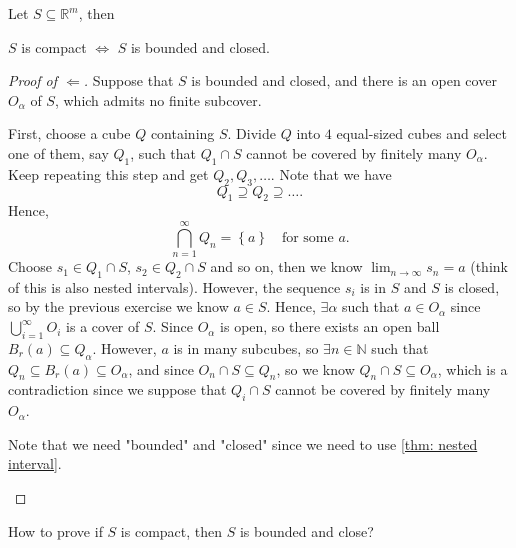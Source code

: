 \begin{theorem}\label{thm: Heine Borel}
    Let \(S \subseteq \mathbb{R} ^m\), then 
    \begin{center}
        \(S\) is compact \(\iff \) \(S\) is bounded and closed.   
    \end{center} 
\end{theorem}
\begin{proof}[Proof of \(\Leftarrow\)]
    Suppose that \(S\) is bounded and closed, and there is an open cover \(O_\alpha \) of \(S\), which admits no finite subcover. 
    
    First, choose a cube \(Q\) containing \(S\). Divide \(Q\) into \(4\) equal-sized cubes and select one of them, say \(Q_1\), such that \(Q_1 \cap S\) cannot be covered by finitely many \(O_\alpha \). Keep repeating this step and get \(Q_2, Q_3, \dots \). Note that we have 
    \[
        Q_1 \supseteq Q_2 \supseteq \dots .
    \]
    Hence,
    \[
        \bigcap_{n=1}^{\infty} Q_n = \left\{ a \right\} \quad \text{for some }a. 
    \]
    Choose \(s_1 \in Q_1 \cap S\), \(s_2 \in Q_2 \cap S\) and so on, then we know \(\lim_{n \to \infty} s_n = a\) (think of this is also nested intervals). However, the sequence \(s_i\) is in \(S\) and \(S\) is closed, so by the previous exercise we know \(a \in S\). Hence, \(\exists \alpha \) such that \(a \in O_\alpha \) since \(\bigcup_{i=1}^{\infty} O_i\) is a cover of \(S\). Since \(O_\alpha \) is open, so there exists an open ball \(B_r(a) \subseteq Q_\alpha \). However, \(a\) is in many subcubes, so \(\exists n \in \mathbb{N} \) such that \(Q_n \subseteq B_r(a) \subseteq O_\alpha \), and since \(O_n \cap S \subseteq Q_n\), so we know \(Q_n \cap S \subseteq O_\alpha \), which is a contradiction since we suppose that \(Q_i \cap S\) cannot be covered by finitely many \(O_\alpha \).
    \begin{note}
        Note that we need "bounded" and "closed" since we need to use \autoref{thm: nested interval}. 
    \end{note}          
\end{proof}

\begin{exercise}
    How to prove if \(S\) is compact, then \(S\) is bounded and close?  
\end{exercise}